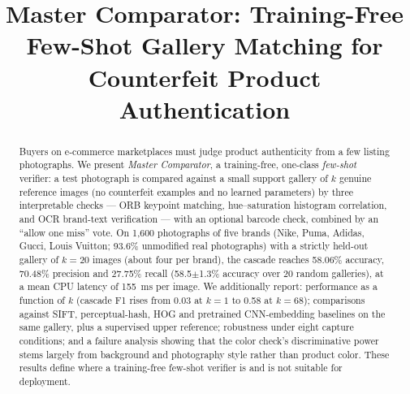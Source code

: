 \documentclass[conference]{IEEEtran}
\begin{document}
\title{Master Comparator: Training-Free Few-Shot Gallery Matching for Counterfeit Product Authentication}

\author{
\and
{}
\and
{}
\and
{}
}

\maketitle

\begin{abstract}
Buyers on e-commerce marketplaces must judge product authenticity from a
few listing photographs. We present \emph{Master Comparator}, a
training-free, one-class \emph{few-shot} verifier: a test photograph is
compared against a small support gallery of $k$ genuine reference images
(no counterfeit examples and no learned parameters) by three interpretable
checks --- ORB keypoint matching, hue--saturation histogram correlation,
and OCR brand-text verification --- with an optional barcode check,
combined by an ``allow one miss'' vote. On 1{,}600 photographs of five
brands (Nike, Puma, Adidas, Gucci, Louis Vuitton; 93.6\% unmodified real
photographs) with a strictly held-out gallery of $k{=}20$ images (about four
per brand), the cascade reaches 58.06\% accuracy, 70.48\% precision and
27.75\% recall (58.5$\pm$1.3\% accuracy over 20 random galleries), at a
mean CPU latency of 155~ms per image. We additionally report: performance
as a function of $k$ (cascade F1 rises from 0.03 at $k{=}1$ to 0.58 at
$k{=}68$); comparisons against SIFT, perceptual-hash, HOG and pretrained
CNN-embedding baselines on the same gallery, plus a supervised upper
reference; robustness under eight capture conditions; and a failure
analysis showing that the color check's discriminative power stems
largely from background and photography style rather than product
color. These results define where a training-free few-shot verifier is
and is not suitable for deployment.
\end{abstract}
\end{document}
